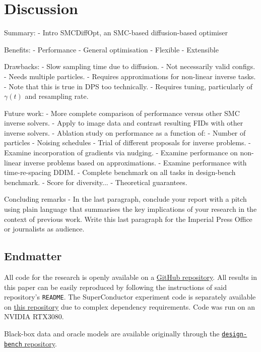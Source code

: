 \chapter{Discussion} \label{chap:discussion}

Summary:
- Intro SMCDiffOpt, an SMC-based diffusion-based optimiser

Benefits:
- Performance
- General optimisation
- Flexible
- Extensible

Drawbacks:
- Slow sampling time due to diffusion.
- Not necessarily valid configs.
- Needs multiple particles.
- Requires approximations for non-linear inverse tasks.
- Note that this is true in DPS too technically.
- Requires tuning, particularly of $\gamma(t)$ and resampling rate.

Future work:
- More complete comparison of performance versus other SMC inverse solvers.
- Apply to image data and contrast resulting FIDs with other inverse solvers.
- Ablation study on performance as a function of:
- Number of particles
- Noising schedules
- Trial of different proposals for inverse problems.
- Examine incorporation of gradients via nudging.
- Examine performance on non-linear inverse problems based on approximations.
- Examine performance with time-re-spacing DDIM.
- Complete benchmark on all tasks in design-bench benchmark.
- Score for diversity...
- Theoretical guarantees.

Concluding remarks
- In the last paragraph, conclude your report with a pitch using plain language that summarises the key implications of your research in the context of previous work. Write this last paragraph for the Imperial Press Office or journalists as audience.


\section*{Endmatter}

All code for the research is openly available on a
\href{https://github.com/bd3dowling/diffusion-research}{GitHub repository}.
All results in this paper can be easily reproduced by following the instructions of said
repository's \texttt{README}. The SuperConductor experiment code is separately available on
\href{https://github.com/bd3dowling/superconductor}{this repository} due to complex dependency
requirements. Code was run on an NVIDIA RTX3080.

Black-box data and oracle models are available originally through the
\href{https://github.com/brandontrabucco/design-bench}{\texttt{design-bench} repository}.
